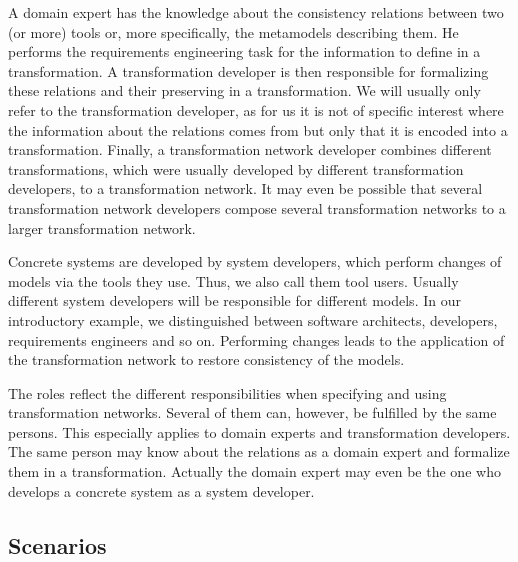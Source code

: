 A domain expert has the knowledge about the consistency relations between two (or more) tools or, more specifically, the metamodels describing them.
He performs the requirements engineering task for the information to define in a transformation.
A transformation developer is then responsible for formalizing these relations and their preserving in a transformation.
We will usually only refer to the transformation developer, as for us it is not of specific interest where the information about the relations comes from but only that it is encoded into a transformation.
Finally, a transformation network developer combines different transformations, which were usually developed by different transformation developers, to a transformation network.
It may even be possible that several transformation network developers compose several transformation networks to a larger transformation network.

Concrete systems are developed by system developers, which perform changes of models via the tools they use.
Thus, we also call them tool users.
Usually different system developers will be responsible for different models.
In our introductory example, we distinguished between software architects, developers, requirements engineers and so on.
Performing changes leads to the application of the transformation network to restore consistency of the models.

The roles reflect the different responsibilities when specifying and using transformation networks.
Several of them can, however, be fulfilled by the same persons.
This especially applies to domain experts and transformation developers.
The same person may know about the relations as a domain expert and formalize them in a transformation.
Actually the domain expert may even be the one who develops a concrete system as a system developer.



\subsection{Scenarios}


